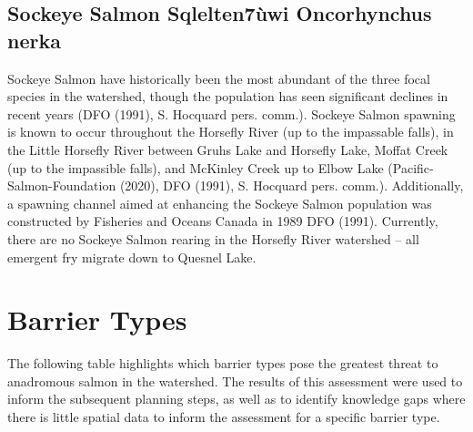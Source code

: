 \documentclass[
  letterpaper,
  DIV=11,
  numbers=noendperiod]{scrreprt}
\begin{document}
\subsection*{Sockeye Salmon \textbar{} Sqlelten7ùwi \textbar{}
Oncorhynchus
nerka}\label{sockeye-salmon-sqlelten7uxf9wi-oncorhynchus-nerka}

Sockeye Salmon have historically been the most abundant of the three
focal species in the watershed, though the population has seen
significant declines in recent years (DFO (1991), S. Hocquard pers.
comm.). Sockeye Salmon spawning is known to occur throughout the
Horsefly River (up to the impassable falls), in the Little Horsefly
River between Gruhs Lake and Horsefly Lake, Moffat Creek (up to the
impassible falls), and McKinley Creek up to Elbow Lake
(Pacific-Salmon-Foundation (2020), DFO (1991), S. Hocquard pers. comm.).
Additionally, a spawning channel aimed at enhancing the Sockeye Salmon
population was constructed by Fisheries and Oceans Canada in 1989 DFO
(1991). Currently, there are no Sockeye Salmon rearing in the Horsefly
River watershed -- all emergent fry migrate down to Quesnel Lake.

\section*{Barrier Types}\label{barrier-types}


The following table highlights which barrier types pose the greatest
threat to anadromous salmon in the watershed. The results of this
assessment were used to inform the subsequent planning steps, as well as
to identify knowledge gaps where there is little spatial data to inform
the assessment for a specific barrier type.
\end{document}

